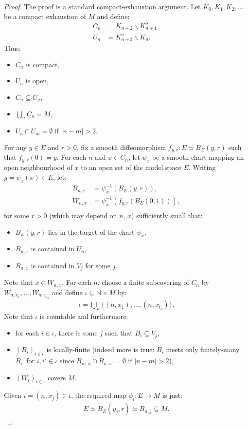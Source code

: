\begin{proof}
  \leanok
  The proof is a standard compact-exhaustion argument.
  Let $K_0, K_1, K_2, \ldots $ be a compact exhaustion of $M$ and define:
  \begin{align*}
    C_n &= K_{n+2} \smallsetminus K_{n+1}^o,\\
    U_n &= K_{n+3}^o \smallsetminus K_n.
  \end{align*}
  Thus:
  \begin{itemize}
    \item $C_n$ is compact,
    \item $U_n$ is open,
    \item $C_n \subseteq U_n$,
    \item $\bigcup_n C_n = M$,
    \item $U_n \cap U_m = \emptyset$ if $|n - m| > 2$.
  \end{itemize}
  For any $y \in E$ and $r > 0$, fix a smooth diffeomorphism $f_{y,r} : E \simeq B_E(y, r)$ such
  that $f_{y,r}(0) = y$.
  For each $n$ and $x \in C_n$, let $\psi_x$  be a smooth chart mapping an open
  neighbourhood of $x$ to an open set of the model space $E$.
  Writing $y = \psi_x (x) \in E$, let:
  \begin{align*}
    B_{n, x} &= \psi_x^{-1} (B_E(y, r)),\\
    W_{n, x} &= \psi_x^{-1} (f_{y,r} (B_E (0, 1))),\\
  \end{align*}
  for some $r > 0$ (which may depend on $n$, $x$) sufficiently small that:
  \begin{itemize}
    \item $B_E(y, r)$ lies in the target of the chart $\psi_x$,
    \item $B_{n,x}$ is contained in $U_n$,
    \item $B_{n,x}$ is contained in $V_j$ for some $j$.
  \end{itemize}
  Note that $x \in W_{n,x}$. For each $n$, choose a finite subcovering of $C_n$ by
  $W_{n, x_1}, \ldots, W_{n, x_{l_n}}$ and define $\iota \subseteq ℕ \times M$ by:
  \begin{align*}
    \iota = \bigcup_n \{ (n, x_1), \ldots, (n, x_{l_n}) \} .
  \end{align*}
  Note that $\iota$ is countable and furthermore:
  \begin{itemize}
    \item for each $i \in \iota$, there is some $j$ such that $B_i \subseteq V_j$,
    \item $(B_i)_{i \in \iota}$ is locally-finite
    (indeed more is true: $B_i$ meets only finitely-many $B_{i'}$ for $i, i' \in \iota$
    since $B_{m, x} \cap B_{n, x'} = \emptyset$ if $|n - m| > 2$),
    \item $(W_i)_{i \in \iota}$ covers $M$.
  \end{itemize}
  Given $i = (n, x_j) \in \iota$, the required map $\phi_i : E \to M$ is just:
  \begin{align*}
    E \simeq B_E(y_j, r) \simeq B_{n,j} \subseteq M.
  \end{align*}
\end{proof}

